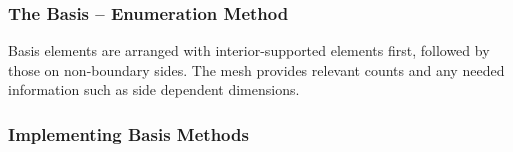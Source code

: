 \documentclass[compress]{beamer}
\begin{document}
\begin{frame}
  \frametitle{The Basis -- Enumeration Method}
  Basis elements are arranged with interior-supported elements first, followed by those on non-boundary sides.
  The mesh provides relevant counts and any needed information such as side dependent dimensions.
  \pause
  \pause
\end{frame}

\subsubsection{Implementing Basis Methods}
\end{document}
